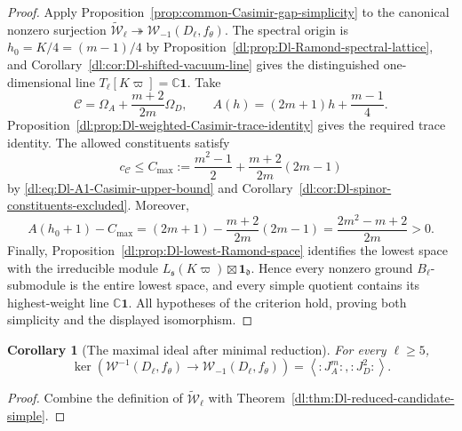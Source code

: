 \documentclass[11pt,reqno]{amsart}
\newtheorem{corollary}[theorem]{Corollary}
\theoremstyle{definition}
\theoremstyle{remark}
\begin{document}
\begin{proof}
Apply Proposition~\ref{prop:common-Casimir-gap-simplicity} to the
canonical nonzero surjection
\(
 \widetilde{\mathcal W}_\ell\twoheadrightarrow
 \mathcal W_{-1}(D_\ell,f_\theta)
\).
The spectral origin is
\(
 h_0=K/4=(m-1)/4
\)
by Proposition~\ref{dl:prop:Dl-Ramond-spectral-lattice}, and
Corollary~\ref{dl:cor:Dl-shifted-vacuum-line} gives the distinguished
one-dimensional line
\(
 T_\ell[K\varpi]=\mathbb C\mathbf1
\).
Take
\begin{equation*}
 \mathcal C
 =
 \Omega_A+\frac{m+2}{2m}\Omega_D,
 \qquad
 A(h)=(2m+1)h+\frac{m-1}{4}.
\end{equation*}
Proposition~\ref{dl:prop:Dl-weighted-Casimir-trace-identity} gives the
required trace identity.  The allowed constituents satisfy
\begin{equation}
 c_{\mathcal C}\le C_{\max}
 :=
 \frac{m^2-1}{2}
 +\frac{m+2}{2m}(2m-1)
 \label{dl:eq:Dl-minus-one-Cmax}
\end{equation}
by \eqref{dl:eq:Dl-A1-Casimir-upper-bound} and
Corollary~\ref{dl:cor:Dl-spinor-constituents-excluded}.  Moreover,
\begin{equation*}
 A(h_0+1)-C_{\max}
 =
 (2m+1)-\frac{m+2}{2m}(2m-1)
 =\frac{2m^2-m+2}{2m}>0.
\end{equation*}
Finally, Proposition~\ref{dl:prop:Dl-lowest-Ramond-space} identifies
the lowest space with the irreducible module
\(
 L_{\mathfrak s}(K\varpi)\boxtimes\mathbf1_{\mathfrak d}
\).  Hence every nonzero ground $B_\ell$-submodule is the entire lowest
space, and every simple quotient contains its highest-weight line
\(\mathbb C\mathbf1\).  All hypotheses of the criterion hold, proving
both simplicity and the displayed isomorphism.
\end{proof}

\begin{corollary}[The maximal ideal after minimal reduction]

For every \(\ell\ge5\),
\begin{equation*}
 \ker\!\left(
   \mathcal W^{-1}(D_\ell,f_\theta)
   \longrightarrow
   \mathcal W_{-1}(D_\ell,f_\theta)
 \right)
 =
 \left\langle:J_A^m:,:J_D^2:\right\rangle.
\end{equation*}
\end{corollary}

\begin{proof}
Combine the definition of \(\widetilde{\mathcal W}_\ell\) with
Theorem~\ref{dl:thm:Dl-reduced-candidate-simple}.
\end{proof}
\end{document}
